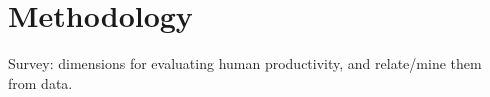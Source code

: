 \section{Methodology}
\label{sec-method}

Survey: dimensions for evaluating human productivity, and relate/mine them from data.





